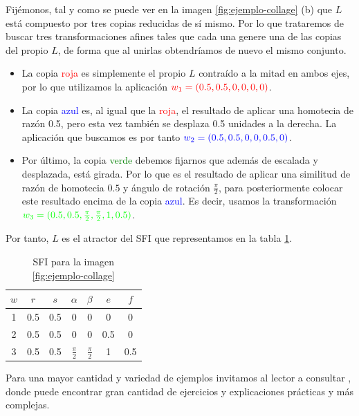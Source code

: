 \begin{ejemplo}
    Fijémonos, tal y como se puede ver en la imagen \ref{fig:ejemplo-collage} (b) que $L$ está compuesto por tres copias reducidas de sí mismo. Por lo que trataremos de buscar tres transformaciones afines tales que cada una genere una de las copias del propio $L$, de forma que al unirlas obtendríamos de nuevo el mismo conjunto.
    \begin{itemize}
        \item La copia \textcolor{red}{roja} es simplemente el propio $L$ contraído a la mitad en ambos ejes, por lo que utilizamos la aplicación $\textcolor{red}{w_1=(0.5,0.5,0,0,0,0)}$.
        \item La copia \textcolor{blue}{azul} es, al igual que la \textcolor{red}{roja}, el resultado de aplicar una homotecia de razón 0.5, pero esta vez también se desplaza 0.5 unidades a la derecha. La aplicación que buscamos es por tanto $\textcolor{blue}{w_2=(0.5,0.5,0,0,0.5,0)}$.
        \item Por último, la copia \textcolor{green}{verde} debemos fijarnos que además de escalada y desplazada, está girada. Por lo que es el resultado de aplicar una similitud de razón de homotecia $0.5$ y ángulo de rotación $\frac \pi 2$, para posteriormente colocar este resultado encima de la copia \textcolor{blue}{azul}. Es decir, usamos la transformación $\textcolor{green}{w_3=(0.5,0.5,\frac{\pi}{2},\frac{\pi}{2},1,0.5)}$.
    \end{itemize}

    Por tanto, $L$ es el atractor del SFI que representamos en la tabla \ref{tabla:ejemplo-collage}.

    \begin{table}[ht]
        \centering
        \begin{tabular}{c|cccccc} \hline
        $w$ & $r$ & $s$ & $\alpha$ & $\beta$ & $e$ & $f$ \\ \hline\hline
        1 & 0.5 & 0.5 & 0 & 0 & 0 & 0 \\ \hline
        2 & 0.5 & 0.5 & 0 & 0 & 0.5 & 0 \\ \hline
        3 & 0.5 & 0.5 & $\frac{\pi}{2}$ & $\frac{\pi}{2}$ & 1 &  0.5 \\ \hline
        \end{tabular}
        \caption{SFI para la imagen \ref{fig:ejemplo-collage}}
        \label{tabla:ejemplo-collage}
    \end{table}
\end{ejemplo}

Para una mayor cantidad y variedad de ejemplos invitamos al lector a consultar \cite[Sección 3.10]{Barnsley}, donde puede encontrar gran cantidad de ejercicios y explicaciones prácticas y más complejas.

